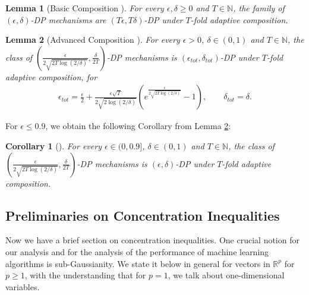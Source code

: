 \documentclass{article}
\newtheorem{corollary}{Corollary}
\newtheorem{lemma}{Lemma}
\begin{document}
\begin{lemma}[Basic Composition \cite{Boost_DP}]
\label{lemma:Basic_Comp}
For every $\epsilon, \delta \geq 0$ and $T \in \mathbb{N}$, the family of $(\epsilon, \delta)$-DP mechanisms are $(T\epsilon, T\delta)$-DP under
$T$-fold adaptive composition.
\end{lemma}

\begin{lemma}[Advanced Composition \cite{Boost_DP}]
\label{lemma:compGDP}
For every $\epsilon > 0$, $\delta \in \left(0, 1\right)$ and $T \in \mathbb{N}$, the class of $\left(\frac{\epsilon}{2\sqrt{2T\log(2/\delta)}}, \frac{\delta}{2T}\right)$-DP mechanisms is $(\epsilon_{tot}, \delta_{tot})$-DP under $T$-fold adaptive composition, for
\begin{align*}
\epsilon_{tot} = \frac{\epsilon}{2} + \frac{\epsilon\sqrt{T}}{2\sqrt{2\log(2/\delta)}}(e^{\frac{\epsilon}{2\sqrt{2T\log(2/\delta)}}} - 1), \qquad \delta_{tot} = \delta.
\end{align*}
\end{lemma}
For $\epsilon \leq 0.9$, we obtain the following Corollary from Lemma \ref{lemma:compGDP}:
\begin{corollary}[\cite{Comp_Thm_Kairouz}]
\label{cor:ADV_COMP_0.9}
For every $\epsilon \in (0, 0.9]$, $\delta \in \left(0, 1\right)$ and $T \in \mathbb{N}$, the class of $\left(\frac{\epsilon}{2\sqrt{2T\log(2/\delta)}}, \frac{\delta}{2T}\right)$-DP mechanisms is $(\epsilon, \delta)$-DP under $T$-fold adaptive composition.
\end{corollary}

\subsection{Preliminaries on Concentration Inequalities}

Now we have a brief section on concentration inequalities. One crucial notion for our analysis and for the analysis of the performance of machine learning algorithms is sub-Gaussianity. We state it below in general for vectors in $\mathbb{R}^p$ for $p \geq 1$, with the understanding that for $p = 1$,
 we talk about one-dimensional variables.
 
\end{document}
